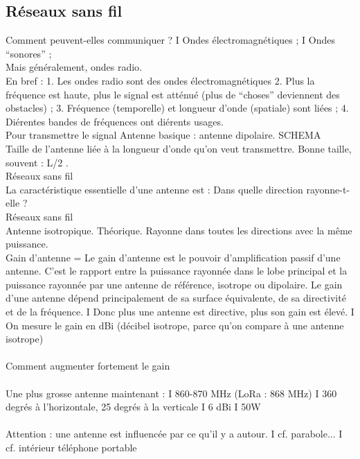 \documentclass[5pt]{article}
\begin{document}
\begin{scriptsize}
\subsection{Réseaux sans fil}
Comment peuvent-elles communiquer ? I Ondes électromagnétiques ; I Ondes “sonores” ;\\
Mais généralement, ondes radio.\\
En bref : 1. Les ondes radio sont des ondes électromagnétiques 2. Plus la fréquence est haute, plus le signal est atténué (plus de “choses” deviennent des obstacles) ; 3. Fréquence (temporelle) et longueur d’onde (spatiale) sont liées ; 4. Diérentes bandes de fréquences ont diérents usages.\\
Pour transmettre le signal Antenne basique : antenne dipolaire.
SCHEMA\\
Taille de l’antenne liée à la longueur d’onde qu’on veut transmettre. Bonne taille, souvent : L/2 .\\
Réseaux sans fil\\
La caractéristique essentielle d’une antenne est : Dans quelle direction rayonne-t-elle ?\\
Réseaux sans fil\\
Antenne isotropique. Théorique. Rayonne dans toutes les directions avec la même puissance.\\
Gain d’antenne = Le gain d’antenne est le pouvoir d’amplification passif d’une antenne. C’est le rapport entre la puissance rayonnée dans le lobe principal et la puissance rayonnée par une antenne de référence, isotrope ou dipolaire. Le gain d’une antenne dépend principalement de sa surface équivalente, de sa directivité et de la fréquence.
I Donc plus une antenne est directive, plus son gain est élevé. I On mesure le gain en dBi (décibel isotrope, parce qu’on compare à une antenne isotrope)\\
\\
Comment augmenter fortement le gain\\
\\
Une plus grosse antenne maintenant : I 860-870 MHz (LoRa : 868 MHz) I 360 degrés à l’horizontale, 25 degrés à la verticale I 6 dBi I 50W\\
\\
Attention : une antenne est influencée par ce qu’il y a autour. I cf. parabole... I cf. intérieur téléphone portable\\

\end{scriptsize}
\end{document}
